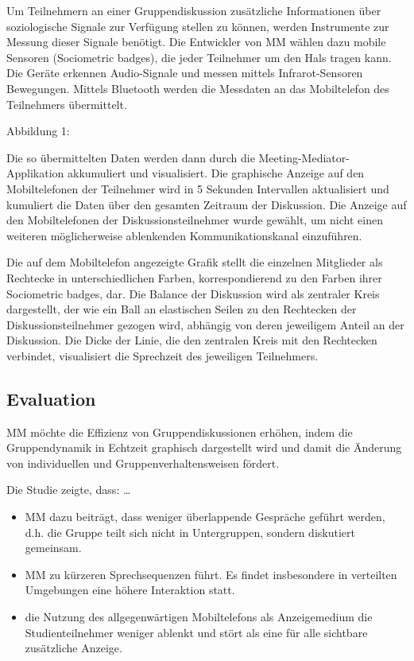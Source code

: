 Um Teilnehmern an einer Gruppendiskussion zusätzliche
Informationen über soziologische Signale zur Verfügung stellen zu können, werden 
Instrumente zur Messung dieser Signale benötigt. Die Entwickler von MM wählen dazu mobile
Sensoren (Sociometric badges), die jeder Teilnehmer um den Hals tragen kann.
Die Geräte erkennen Audio-Signale und messen mittels Infrarot-Sensoren
Bewegungen. Mittels Bluetooth werden die Messdaten an das Mobiltelefon des
Teilnehmers übermittelt. 
\par
{}
\par
Abbildung 1:

Die so übermittelten Daten werden dann durch die
Meeting-Mediator-Applikation akkumuliert und visualisiert.
Die graphische Anzeige auf den Mobiltelefonen der Teilnehmer wird in 5 Sekunden
Intervallen aktualisiert und kumuliert die Daten über den gesamten Zeitraum der Diskussion.
Die Anzeige auf den Mobiltelefonen der Diskussionsteilnehmer wurde gewählt, um
nicht einen weiteren möglicherweise ablenkenden Kommunikationskanal einzuführen.

Die auf dem Mobiltelefon angezeigte Grafik stellt die einzelnen Mitglieder als
Rechtecke in unterschiedlichen Farben, korrespondierend zu den Farben ihrer
Sociometric badges, dar. Die Balance der Diskussion wird als zentraler Kreis dargestellt, der wie
ein Ball an elastischen Seilen zu den Rechtecken der Diskussionsteilnehmer
gezogen wird, abhängig von deren jeweiligem Anteil an der Diskussion. Die Dicke
der Linie, die den zentralen Kreis mit den Rechtecken verbindet, visualisiert die Sprechzeit des jeweiligen Teilnehmers. 
\par
{}
\par

\subsection{Evaluation}
MM möchte die Effizienz von Gruppendiskussionen erhöhen, indem die
Gruppendynamik in Echtzeit graphisch dargestellt wird und damit die Änderung von 
 individuellen und Gruppenverhaltensweisen fördert.
 
Die Studie zeigte, dass:
\dots
\begin{itemize}
  \item MM dazu beiträgt, dass weniger überlappende Gespräche geführt werden, d.h. die
Gruppe teilt sich nicht in Untergruppen, sondern diskutiert gemeinsam.
  \item MM zu kürzeren Sprechsequenzen führt. Es findet insbesondere in verteilten
Umgebungen eine höhere Interaktion statt.
  \item die Nutzung des allgegenwärtigen Mobiltelefons als Anzeigemedium die
Studienteilnehmer weniger ablenkt und stört als eine für alle sichtbare
zusätzliche Anzeige.

\end{itemize}


